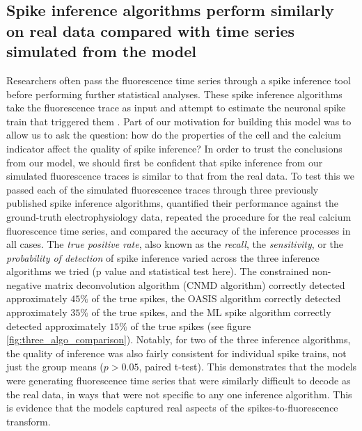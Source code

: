 \subsection{Spike inference algorithms perform similarly on real data compared with time series simulated from the model}
Researchers often pass the fluorescence time series through a spike inference tool before performing further statistical analyses. These spike inference algorithms take the fluorescence trace as input and attempt to estimate the neuronal spike train that triggered them \parencite{vogelstein, pnevmatikakis, friedrich, paninski1, paninski2, deneux}. Part of our motivation for building this model was to allow us to ask the question: how do the properties of the cell and the calcium indicator affect the quality of spike inference? In order to trust the conclusions from our model, we should first be confident that spike inference from our simulated fluorescence traces is similar to that from the real data. To test this we passed each of the simulated fluorescence traces through three previously published spike inference algorithms, quantified their performance against the ground-truth electrophysiology data, repeated the procedure for the real calcium fluorescence time series, and compared the accuracy of the inference processes in all cases. The \textit{true positive rate}, also known as the \textit{recall}, the \textit{sensitivity}, or the \textit{probability of detection} of spike inference varied across the three inference algorithms we tried (p value and statistical test here). The constrained non-negative matrix deconvolution algorithm  \parencite{pnevmatikakis} (CNMD algorithm) correctly detected approximately $45\%$ of the true spikes, the OASIS algorithm  \parencite{friedrich} correctly detected approximately $35\%$ of the true spikes, and the ML spike algorithm  \parencite{deneux} correctly detected approximately $15\%$ of the true spikes (see figure \ref{fig:three_algo_comparison}). Notably, for two of the three inference algorithms, the quality of inference was also fairly consistent for individual spike trains, not just the group means ($p > 0.05$, paired t-test). This demonstrates that the models were generating fluorescence time series that were similarly difficult to decode as the real data, in ways that were not specific to any one inference algorithm. This is evidence that the models captured real aspects of the spikes-to-fluorescence transform.
